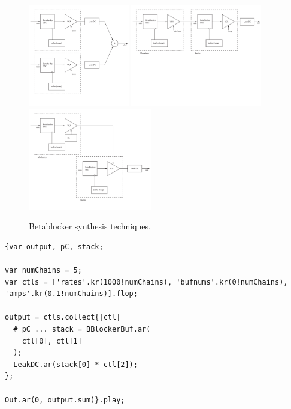 \documentclass[letterpaper, 12pt]{article}
\begin{document}

\begin{figure}
	\centering
		\includegraphics[height=1.75in]{Additive-Betablocker}
		\includegraphics[height=1.75in]{FM-Betablocker}
		\includegraphics[height=1.75in]{AM-Betablocker}
	\caption{Betablocker synthesis techniques.}
	\label{fig:fig_Additive-Betablocker}
\end{figure}

\begin{Verbatim}[fontfamily=courier, xleftmargin=\parindent]
{var output, pC, stack;

var numChains = 5;
var ctls = ['rates'.kr(1000!numChains), 'bufnums'.kr(0!numChains), 'amps'.kr(0.1!numChains)].flop;

output = ctls.collect{|ctl|
  # pC ... stack = BBlockerBuf.ar(
    ctl[0], ctl[1]
  );
  LeakDC.ar(stack[0] * ctl[2]);
};

Out.ar(0, output.sum)}.play;
\end{Verbatim}
\end{document}
